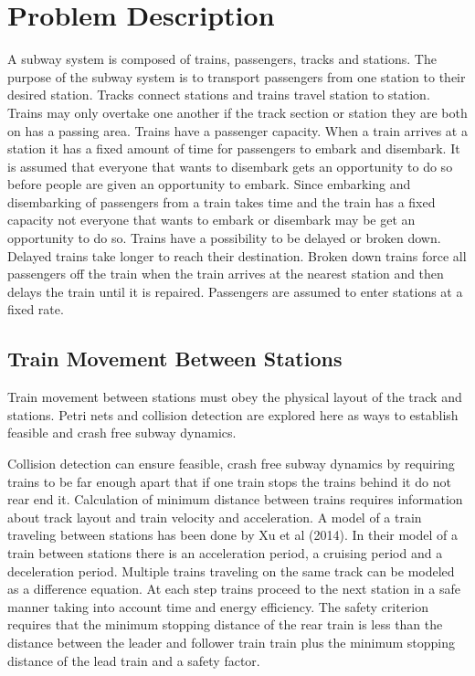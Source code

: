 \section{Problem Description}

A subway system is composed of trains, passengers, tracks and stations. The
purpose of the subway system is to transport passengers from one station to
their desired station. Tracks connect stations and trains travel station to
station. Trains may only overtake one another if the track section or station
they are both on has a passing area. Trains have a passenger capacity. When a
train arrives at a station it has a fixed amount of time for passengers to
embark and disembark. It is assumed that everyone that wants to disembark gets an
opportunity to do so before people are given an opportunity to embark. Since
embarking and disembarking of passengers from a train takes time and the train
has a fixed capacity not everyone that wants to embark or disembark may be
get an opportunity to do so. Trains have a possibility to be delayed or broken
down. Delayed trains take longer to reach their destination. Broken down trains
force all passengers off the train when the train arrives at the nearest station
and then delays the train until it is repaired. Passengers are assumed to enter
stations at a fixed rate.

\subsection{Train Movement Between Stations}

Train movement between stations must obey the physical layout of the track and
stations. Petri nets and collision detection are explored here as ways to
establish feasible and crash free subway dynamics.

Collision detection can ensure feasible, crash free subway dynamics by requiring
trains to be far enough apart that if one train stops the trains behind it do
not rear end it. Calculation of minimum distance between trains requires
information about track layout and train velocity and acceleration. A model of a
train traveling between stations has been done by Xu et al (2014). In their
model of a train between stations there is an acceleration period, a cruising
period and a deceleration period. Multiple trains traveling on the same track
can be modeled as a difference equation. At each step trains proceed to the next
station in a safe manner taking into account time and energy efficiency. The
safety criterion requires that the minimum stopping distance of the rear train
is less than the distance between the leader and follower train train plus the
minimum stopping distance of the lead train and a safety factor. 

